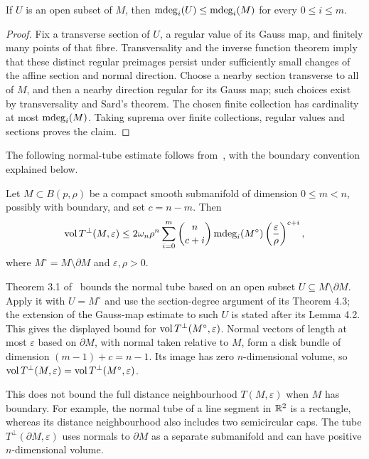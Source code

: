 \begin{lemma}\label{lem:degree-restriction}
If $U$ is an open subset of $M$, then $\operatorname{\mathrm{mdeg}}_i(U)\le\operatorname{\mathrm{mdeg}}_i(M)$ for every $0\le i\le m$.
\end{lemma}

\begin{proof}
Fix a transverse section of $U$, a regular value of its Gauss map, and finitely many points of that fibre. Transversality and the inverse function theorem imply that these distinct regular preimages persist under sufficiently small changes of the affine section and normal direction. Choose a nearby section transverse to all of $M$, and then a nearby direction regular for its Gauss map; such choices exist by transversality and Sard's theorem. The chosen finite collection has cardinality at most $\operatorname{\mathrm{mdeg}}_i(M)$. Taking suprema over finite collections, regular values and sections proves the claim.
\end{proof}

The following normal-tube estimate follows from~\cite[Theorems 3.1 and 4.3]{lotz2015volume}, with the boundary convention explained below.

\begin{theorem}\label{thm:tube_bound}
Let $M\subset B(p,\rho)$ be a compact smooth submanifold of dimension $0\le m<n$, possibly with boundary, and set $c=n-m$. Then
\[
\operatorname{vol} T^\perp(M,\varepsilon)\le
2\omega_n\rho^n\sum_{i=0}^m\binom n{c+i}\operatorname{\mathrm{mdeg}}_i(M^\circ)
\left(\frac{\varepsilon}{\rho}\right)^{c+i},
\]
where $M^\circ=M\setminus\partial M$ and $\varepsilon,\rho>0$.
\end{theorem}

\begin{remark}\label{rem:tube_bound_boundary}
Theorem 3.1 of~\cite{lotz2015volume} bounds the normal tube based on an open subset $U\subseteq M\setminus\partial M$. Apply it with $U=M^\circ$ and use the section-degree argument of its Theorem 4.3; the extension of the Gauss-map estimate to such $U$ is stated after its Lemma 4.2. This gives the displayed bound for $\operatorname{vol} T^\perp(M^\circ,\varepsilon)$. Normal vectors of length at most $\varepsilon$ based on $\partial M$, with normal taken relative to $M$, form a disk bundle of dimension $(m-1)+c=n-1$. Its image has zero $n$-dimensional volume, so $\operatorname{vol} T^\perp(M,\varepsilon)=\operatorname{vol} T^\perp(M^\circ,\varepsilon)$.

This does not bound the full distance neighbourhood $T(M,\varepsilon)$ when $M$ has boundary. For example, the normal tube of a line segment in $\mathbb{R}^2$ is a rectangle, whereas its distance neighbourhood also includes two semicircular caps. The tube $T^\perp(\partial M,\varepsilon)$ uses normals to $\partial M$ as a separate submanifold and can have positive $n$-dimensional volume.
\end{remark}


